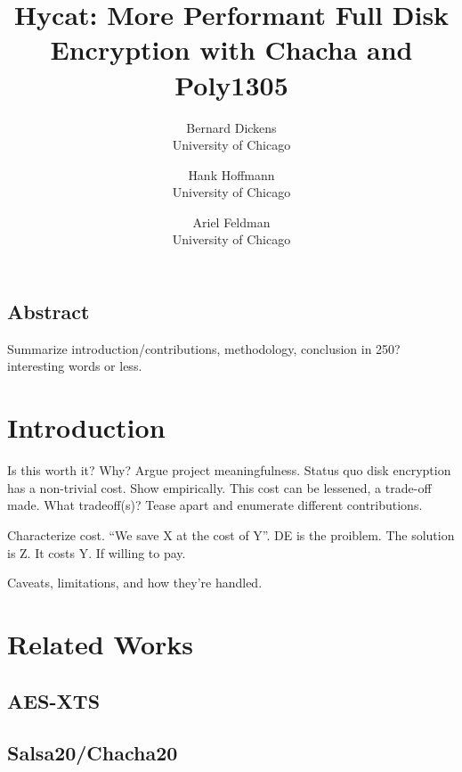 \documentclass[letterpaper,twocolumn,10pt]{article}
\begin{document}
\date{}

\title{\Large \bf Hycat: More Performant Full Disk Encryption with Chacha and Poly1305}

\author{
{\rm Bernard Dickens}\\
University of Chicago
\and
{\rm Hank Hoffmann}\\
University of Chicago
\and
{\rm Ariel Feldman}\\
University of Chicago
} %

\maketitle

\thispagestyle{empty}


\subsection*{Abstract}
Summarize introduction/contributions, methodology, conclusion in 250? interesting words or less.

\section{Introduction}
Is this worth it? Why? Argue project meaningfulness. Status quo disk encryption has a non-trivial cost. Show empirically.
This cost can be lessened, a trade-off made. What tradeoff(s)? Tease apart and enumerate different contributions.

Characterize cost. ``We save X at the cost of Y''. DE is the proiblem. The solution is Z. It costs Y. If willing to pay.

Caveats, limitations, and how they're handled.

\section{Related Works}
\subsection{AES-XTS}
\subsection{Salsa20/Chacha20}
\end{document}
